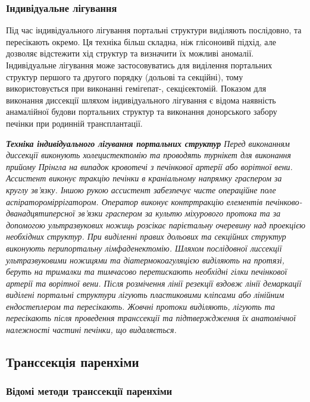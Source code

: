 \begin{refsection}
\subsubsection{Індивідуальне лігування}

Під час індивідуального лігування портальні структури виділяють послідовно, та пересікають окремо. Ця техніка більш складна, ніж глісоноивй підхід, але дозволяє відстежити хід структур та визначити їх можливі аномалії. Індивідуальне лігування може застосовуватись для виділення портальних структур першого та другого порядку (дольові та секційні), тому використовується при виконанні гемігепат-, секцієектомій. Показом для виконання диссекції шляхом індивідуального лігування є відома наявність анамалійної будови портальних структур та виконання донорського забору печінки при родинній трансплантації.

\textit{ \textbf{Техніка індивідуального лігування портальних структур} Перед виконанням диссекції виконують холецистектомію та проводять турнікет для виконання прийому Прінгла на випадок кровотечі з печінкової артерії або ворітної вени. Ассистент виконує тракцію печінки в краніальному напрямку граспером за круглу зв'язку. Іншою рукою ассистент забезпечує чисте операційне поле аспіратором\-іррігатором. Оператор виконує контртракцію елементів печінково-\-дванадцятиперсної зв'язки граспером за культю міхурового протока та за допомогою ультразвукових ножиць розсікає парієтальну очеревину над проекцією необхідних структур. При виділенні правих дольових та секційних структур виконують перипортальну лімфаденектомію. Шляхом послідовної лиссекції ультразвуковими ножицями та діатермокоагуляцією виділяють на протязі, беруть на трималки та тимчасово перетискають необхідні гілки печінкової артерії та ворітної вени. Після розмічення лінії резекції вздовж лінії демаркації виділені портальні структури лігують пластиковими кліпсами або лінійним ендостеплером та пересікають. Жовчні протоки виділяють, лігують та пересікають після проведення транссекції та підтверждження їх анатомічної належності частині печінки, що видаляється.}



\subsection{Транссекція паренхіми}

\subsubsection{Відомі методи транссекції паренхіми}


\end{refsection}
